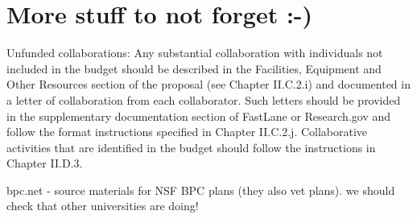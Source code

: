 %

\iflater
\section*{More stuff to not forget :-)}

Unfunded collaborations: Any substantial collaboration with
individuals not included in the budget should be described in the
Facilities, Equipment and Other Resources section of the proposal (see
Chapter II.C.2.i) and documented in a letter of collaboration from
each collaborator. Such letters should be provided in the
supplementary documentation section of FastLane or Research.gov and
follow the format instructions specified in Chapter
II.C.2.j. Collaborative activities that are identified in the budget
should follow the instructions in Chapter II.D.3.  

bpc.net - source materials for NSF BPC plans (they also vet plans).
  we should check that other universities are doing!

\fi
